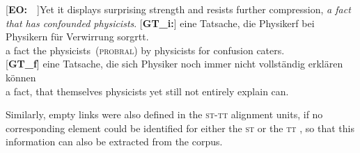\documentclass[output=paper]{LSP/langsci}
\begin{document}
\ea \label{ex:1:3}
\begin{xlist}
\exi{}[\textbf{EO:}~~]{Yet it displays surprising strength and resists further compression, \emph{a fact that has confounded physicists}.}
\exi{}[\textbf{GT\_i:}]{
\gll \raute\stern\stern{} eine{\raute} Tatsache,{\raute} die{\raute} Physikerf\raute\stern\pfeil\pfeil\raute{\color{red}[{\stern}11.968]}\pfeil\pfeil\pfeil\pfeil\pfeil\pfeil\pfeil\pfeil\pfeil{} bei\raute{} Physikern\raute{} für\raute{} Verwirrung\raute{} sorgrt\pfeil\pfeil{}t.\\
 {} a fact the physicists~(\textsc{probral}) by physicists for confusion caters.\\
}
\exi{}[\textbf{GT\_f}]{
\gll  eine Tatsache, die sich Physiker noch immer nicht vollständig erklären können\\
  a fact, that themselves physicists yet still not entirely explain can.\\
}
\end{xlist}
\z

Similarly, empty links were also defined in the \textsc{st}-\textsc{tt} alignment units, if no corresponding element could be identified for either the \textsc{st} or the \textsc{tt} \citep{Culo2012}, so that this information can also be extracted from the corpus.    
\end{document}
